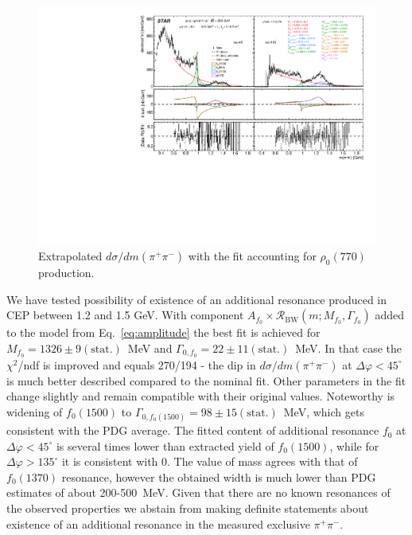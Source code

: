 \begin{figure}%
\centering
\includegraphics[width=\textwidth,page=1]{graphics/physicsResults/InvMassFit/WITH_RHO/RatioAndInterference_PiPiInvMass_Fit.pdf}
%
\caption{Extrapolated $d\sigma/dm(\pi^{+}\pi^{-})$ with the fit accounting for $\rho_{0}(770)$ production.}
\label{invMassFit_WITH_RHO}
\end{figure}

%

We have tested possibility of existence of an additional resonance produced in CEP between 1.2 and 1.5 GeV. With component $A_{f_0} \times \mathcal{R}_{\textrm{BW}}\left(m;M_{f_0},\Gamma_{f_0}\right)$ added to the model from Eq.~\eqref{eq:amplitude} the best fit is achieved for $M_{f_0}=1326 \pm 9 (\text{stat.})$~MeV and $\Gamma_{0,f_0} = 22 \pm 11 (\text{stat.})$~MeV. In that case the $\chi^{2}$/ndf is improved and equals 270/194 - the dip in $d\sigma/dm(\pi^{+}\pi^{-})$ at $\Delta\varphi<45^{\circ}$ is much better described compared to the nominal fit. Other parameters in the fit change slightly and remain compatible with their original values. Noteworthy is widening of $f_{0}(1500)$ to $\Gamma_{0,f_0(1500)} = 98 \pm 15 (\text{stat.})$~MeV, which gets consistent with the PDG average. The fitted content of additional resonance $f_0$ at $\Delta\varphi<45^{\circ}$ is several times lower than extracted yield of $f_{0}(1500)$, while for $\Delta\varphi>135^{\circ}$ it is consistent with 0. The value of mass agrees with that of $f_{0}(1370)$ resonance, however the obtained width is much lower than PDG estimates of about 200-500~MeV. Given that there are no known resonances of the observed properties we abstain from making definite statements about existence of an additional resonance in the measured exclusive $\pi^{+}\pi^{-}$.
%

